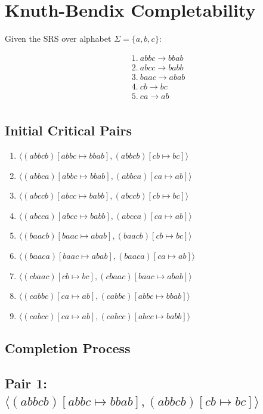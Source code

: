 \documentclass{article}
\begin{document}
\section{Knuth-Bendix Completability}

Given the SRS over alphabet $\Sigma = \{a, b, c\}$:

\begin{align*}
&1.\ abbc \to bbab \\
&2.\ abcc \to babb \\  
&3.\ baac \to abab \\
&4.\ cb \to bc \\
&5.\ ca \to ab \\
\end{align*}

\subsection{Initial Critical Pairs}

\begin{enumerate}
\item $\langle (abbcb)[abbc \mapsto bbab], (abbcb)[cb \mapsto bc] \rangle$
\item $\langle (abbca)[abbc \mapsto bbab], (abbca)[ca \mapsto ab] \rangle$
\item $\langle (abccb)[abcc \mapsto babb], (abccb)[cb \mapsto bc] \rangle$
\item $\langle (abcca)[abcc \mapsto babb], (abcca)[ca \mapsto ab] \rangle$
\item $\langle (baacb)[baac \mapsto abab], (baacb)[cb \mapsto bc] \rangle$
\item $\langle (baaca)[baac \mapsto abab], (baaca)[ca \mapsto ab] \rangle$
\item $\langle (cbaac)[cb \mapsto bc], (cbaac)[baac \mapsto abab] \rangle$
\item $\langle (cabbc)[ca \mapsto ab], (cabbc)[abbc \mapsto bbab] \rangle$
\item $\langle (cabcc)[ca \mapsto ab], (cabcc)[abcc \mapsto babb] \rangle$
\end{enumerate}

\subsection{Completion Process}

\subsection{Pair 1: $\langle (abbcb)[abbc \mapsto bbab], (abbcb)[cb \mapsto bc] \rangle$}
\end{document}
